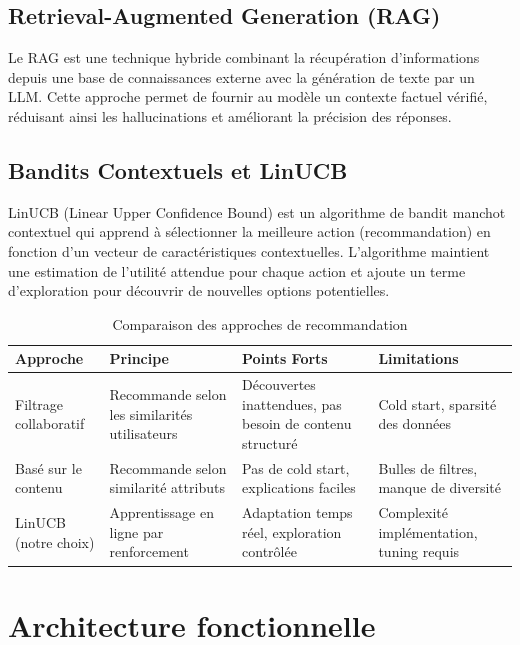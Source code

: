\subsection{Retrieval-Augmented Generation (RAG)}

Le RAG est une technique hybride combinant la récupération d'informations depuis une base de connaissances externe avec la génération de texte par un LLM. Cette approche permet de fournir au modèle un contexte factuel vérifié, réduisant ainsi les hallucinations et améliorant la précision des réponses.

\subsection{Bandits Contextuels et LinUCB}

LinUCB (Linear Upper Confidence Bound) est un algorithme de bandit manchot contextuel qui apprend à sélectionner la meilleure action (recommandation) en fonction d'un vecteur de caractéristiques contextuelles. L'algorithme maintient une estimation de l'utilité attendue pour chaque action et ajoute un terme d'exploration pour découvrir de nouvelles options potentielles.

\begin{table}[H]
    \centering
    \caption{Comparaison des approches de recommandation}
    \label{tab:recommendation_comparison}
    \small
    \begin{tabular}{p{2.5cm} p{4cm} p{4cm} p{4cm}}
        \toprule
        \textbf{Approche} & \textbf{Principe} & \textbf{Points Forts} & \textbf{Limitations} \\
        \midrule
        Filtrage collaboratif & Recommande selon les similarités utilisateurs & Découvertes inattendues, pas besoin de contenu structuré & Cold start, sparsité des données \\
        Basé sur le contenu & Recommande selon similarité attributs & Pas de cold start, explications faciles & Bulles de filtres, manque de diversité \\
        LinUCB (notre choix) & Apprentissage en ligne par renforcement & Adaptation temps réel, exploration contrôlée & Complexité implémentation, tuning requis \\
        \bottomrule
    \end{tabular}
\end{table}


\section{Architecture fonctionnelle}

